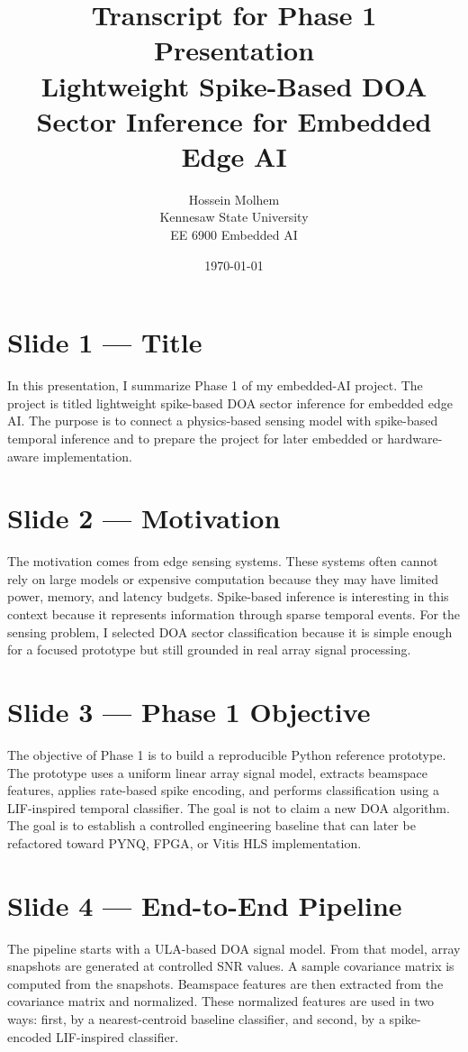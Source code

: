 \documentclass[11pt]{article}
\title{Transcript for Phase 1 Presentation\\Lightweight Spike-Based DOA Sector Inference for Embedded Edge AI}
\author{Hossein Molhem\\Kennesaw State University\\EE 6900 Embedded AI}
\date{\today}
\begin{document}
\maketitle

\section*{Slide 1 --- Title}

In this presentation, I summarize Phase 1 of my embedded-AI project. The project is titled lightweight spike-based DOA sector inference for embedded edge AI. The purpose is to connect a physics-based sensing model with spike-based temporal inference and to prepare the project for later embedded or hardware-aware implementation.

\section*{Slide 2 --- Motivation}

The motivation comes from edge sensing systems. These systems often cannot rely on large models or expensive computation because they may have limited power, memory, and latency budgets. Spike-based inference is interesting in this context because it represents information through sparse temporal events. For the sensing problem, I selected DOA sector classification because it is simple enough for a focused prototype but still grounded in real array signal processing.

\section*{Slide 3 --- Phase 1 Objective}

The objective of Phase 1 is to build a reproducible Python reference prototype. The prototype uses a uniform linear array signal model, extracts beamspace features, applies rate-based spike encoding, and performs classification using a LIF-inspired temporal classifier. The goal is not to claim a new DOA algorithm. The goal is to establish a controlled engineering baseline that can later be refactored toward PYNQ, FPGA, or Vitis HLS implementation.

\section*{Slide 4 --- End-to-End Pipeline}

The pipeline starts with a ULA-based DOA signal model. From that model, array snapshots are generated at controlled SNR values. A sample covariance matrix is computed from the snapshots. Beamspace features are then extracted from the covariance matrix and normalized. These normalized features are used in two ways: first, by a nearest-centroid baseline classifier, and second, by a spike-encoded LIF-inspired classifier.
\end{document}
